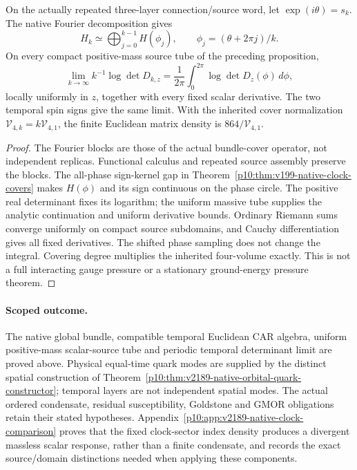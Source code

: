 \documentclass[12pt,a4paper]{article}
\begin{document}
\begin{proposition}
\label{p10:prop:v2189-native-clock-bloch-limit}
On the actually repeated three-layer connection/source word, let
$\exp(i\theta)=s_k$. The native Fourier decomposition gives
\[
 H_k\simeq\bigoplus_{j=0}^{k-1}H(\phi_j),\qquad
 \phi_j=(\theta+2\pi j)/k.
\]
On every compact positive-mass source tube of the preceding proposition,
\[
 \lim_{k\to\infty}k^{-1}\log\det D_{k,z}
 =\frac1{2\pi}\int_0^{2\pi}\log\det D_z(\phi)\,d\phi,
\]
locally uniformly in $z$, together with every fixed scalar derivative.
The two temporal spin signs give the same limit. With the inherited
cover normalization $\mathcal V_{4,k}=k\mathcal V_{4,1}$, the finite
Euclidean matrix density is $864/\mathcal V_{4,1}$.
\end{proposition}
\begin{proof}
The Fourier blocks are those of the actual bundle-cover operator, not
independent replicas. Functional calculus and repeated source assembly
preserve the blocks. The all-phase sign-kernel gap in
Theorem~\ref{p10:thm:v199-native-clock-covers} makes
$H(\phi)$ and its sign continuous on the phase circle. The positive
real determinant fixes its logarithm; the uniform massive tube supplies
the analytic continuation and uniform derivative bounds. Ordinary Riemann
sums converge uniformly on compact source subdomains, and Cauchy
differentiation gives all fixed derivatives. The shifted phase sampling
does not change the integral. Covering degree multiplies the inherited
four-volume exactly. This is not a full interacting gauge pressure or a
stationary ground-energy pressure theorem.
\end{proof}

\paragraph{Scoped outcome.}
The native global bundle, compatible temporal Euclidean CAR algebra,
uniform positive-mass scalar-source tube and periodic temporal determinant
limit are proved above. Physical equal-time quark modes are supplied by the
distinct spatial construction of
Theorem~\ref{p10:thm:v2189-native-orbital-quark-constructor}; temporal
layers are not independent spatial modes. The actual ordered condensate,
residual susceptibility, Goldstone and GMOR obligations retain their stated
hypotheses. Appendix~\ref{p10:app:v2189-native-clock-comparison} proves
that the fixed clock-sector index density produces a divergent massless
scalar response, rather than a finite condensate, and records the exact
source/domain distinctions needed when applying these components.
\end{document}
